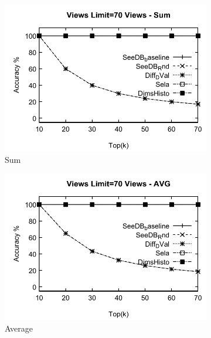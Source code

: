\begin{figure}[h]
  \begin{subfigure}[b]{0.32\textwidth}
    \includegraphics[width=\textwidth]{SumA1.pdf}
    \caption{Sum   }
        \label{fig:SumA1}%
  \end{subfigure}
  \begin{subfigure}[b]{0.32\textwidth}
    \includegraphics[width=\textwidth]{AvgA1.pdf}
     \caption{Average  }
        \label{fig:AvgA1}
  \end{subfigure}
  \begin{subfigure}[b]{0.32\textwidth}

\end{subfigure}
\end{figure}
